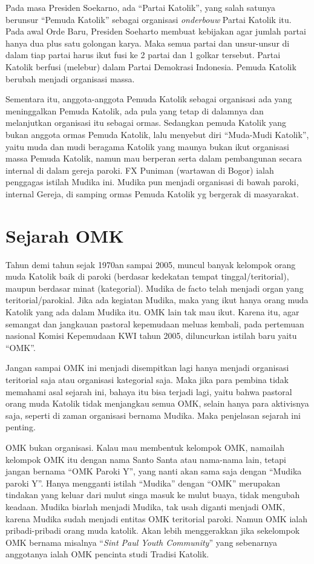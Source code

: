 Pada masa Presiden Soekarno, ada “Partai Katolik”, yang salah satunya berunsur “Pemuda Katolik” sebagai organisasi \textit{onderbouw} Partai Katolik itu. Pada awal Orde Baru, Presiden Soeharto membuat kebijakan agar jumlah partai hanya dua plus satu golongan karya. Maka semua partai dan unsur-unsur di dalam tiap partai harus ikut fusi ke 2 partai dan 1 golkar tersebut. Partai Katolik berfusi (melebur) dalam Partai Demokrasi Indonesia. Pemuda Katolik berubah menjadi organisasi massa. 

Sementara itu, anggota-anggota Pemuda Katolik sebagai organisasi ada yang meninggalkan Pemuda Katolik, ada pula yang tetap di dalamnya dan melanjutkan organisasi itu sebagai ormas. Sedangkan pemuda Katolik yang bukan anggota ormas Pemuda Katolik, lalu menyebut diri “Muda-Mudi Katolik”, yaitu muda dan mudi beragama Katolik yang maunya bukan ikut organisasi massa Pemuda Katolik, namun mau berperan serta dalam pembangunan secara internal di dalam gereja paroki. FX Puniman (wartawan di Bogor) ialah penggagas istilah Mudika ini. Mudika pun menjadi organisasi di bawah paroki, internal Gereja, di samping ormas Pemuda Katolik yg bergerak di masyarakat.
\normalsize

\section*{Sejarah OMK}
Tahun demi tahun sejak 1970an sampai 2005, muncul banyak kelompok orang muda Katolik baik di paroki (berdasar kedekatan tempat tinggal/teritorial), maupun berdasar minat (kategorial). Mudika de facto telah menjadi organ yang teritorial/parokial. Jika ada kegiatan Mudika, maka yang ikut hanya orang muda Katolik yang ada dalam Mudika itu. OMK lain tak mau ikut. Karena itu, agar semangat dan jangkauan pastoral kepemudaan meluas kembali, pada pertemuan nasional Komisi Kepemudaan KWI tahun 2005, diluncurkan istilah baru yaitu “OMK”. 

Jangan sampai OMK ini menjadi disempitkan lagi hanya menjadi organisasi teritorial saja atau organisasi kategorial saja. Maka jika para pembina tidak memahami asal sejarah ini, bahaya itu bisa terjadi lagi, yaitu bahwa pastoral orang muda Katolik tidak menjangkau semua OMK, selain hanya para aktivisnya saja, seperti di zaman organisasi bernama Mudika. Maka penjelasan sejarah ini penting. 

OMK bukan organisasi. Kalau mau membentuk kelompok OMK, namailah kelompok OMK itu dengan nama Santo Santa atau nama-nama lain, tetapi jangan bernama “OMK Paroki Y”, yang nanti akan sama saja dengan “Mudika paroki Y”. Hanya mengganti istilah “Mudika” dengan “OMK” merupakan tindakan yang keluar dari mulut singa masuk ke mulut buaya, tidak mengubah keadaan. Mudika biarlah menjadi Mudika, tak usah diganti menjadi OMK, karena Mudika sudah menjadi entitas OMK teritorial paroki. Namun OMK ialah pribadi-pribadi orang muda katolik. Akan lebih menggerakkan jika sekelompok OMK bernama misalnya “\textit{Sint Paul Youth Community}” yang sebenarnya anggotanya ialah OMK pencinta studi Tradisi Katolik. 

